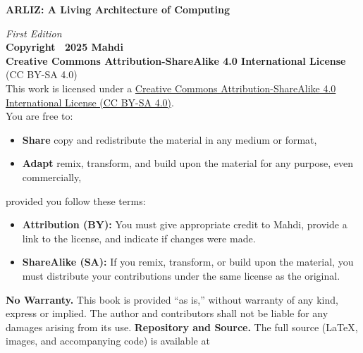 \documentclass[12pt, oneside, openany]{book}
\begin{document}
\thispagestyle{empty}
\begin{center}
    \newpage    
	 {\footnotesize
		\textbf{ARLIZ: A Living Architecture of Computing}\\
		\vspace{0.5em}
		\textit{First Edition}\\
		\vspace{1.5em}
		\textbf{Copyright \textcopyright\ 2025 Mahdi}\\
		\vspace{1em}
		\textbf{Creative Commons Attribution-ShareAlike 4.0 International License}\\
		(CC BY-SA 4.0)\\
		\vspace{1.5em}
		This work is licensed under a \href{https://creativecommons.org/licenses/by-sa/4.0/}{Creative Commons Attribution-ShareAlike 4.0 International License (CC BY-SA 4.0)}.\\
		You are free to:\newline
		\begin{itemize}\itemsep0pt
			\item \textbf{Share} \— copy and redistribute the material in any medium or format,\newline
			\item \textbf{Adapt} \— remix, transform, and build upon the material for any purpose, even commercially,
		\end{itemize}
		provided you follow these terms:\newline
		\begin{itemize}\itemsep0pt
			\item \textbf{Attribution (BY):} You must give appropriate credit to Mahdi, provide a link to the license, and indicate if changes were made.\\
			\item \textbf{ShareAlike (SA):} If you remix, transform, or build upon the material, you must distribute your contributions under the same license as the original.
		\end{itemize}
		\vspace{1.5em}
		\textbf{No Warranty.} This book is provided “as is,” without warranty of any kind, express or implied. The author and contributors shall not be liable for any damages arising from its use.\newline
		\textbf{Repository and Source.} The full source (LaTeX, images, and accompanying code) is available at\newline
}
\end{center}
\end{document}
